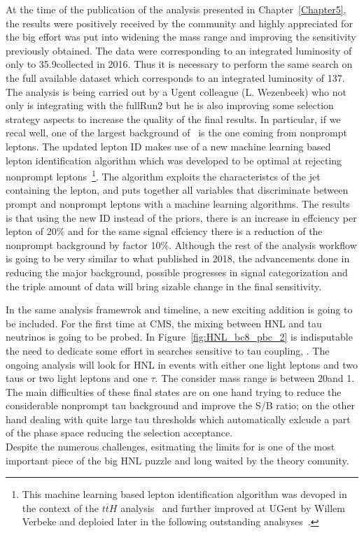 At the time of the publication of the analysis presented in
Chapter~\ref{Chapter5}, the results were positively received by the community and highly appreciated
for the big effort was put into widening the mass range and
improving the sensitivity previously obtained. The
data were corresponding to an integrated luminosity of only to
35.9\fbinv collected in 2016. Thus it is necessary to perform the same
search on the full available dataset which corresponds to an integrated luminosity of 
137\fbinv. \\
The analysis is being carried out by a Ugent colleague (L. Wezenbeek)
who not only is integrating with the fullRun2 but he is also improving
some selection strategy aspects to increase the quality of the final
results. In particular, if we recal well, one of the largest
background of~\cite{Sirunyan:2018mtv} is the one coming from nonprompt
leptons. The updated lepton ID makes use of a new machine learning
based lepton identification algorithm which was developed to be
optimal at rejecting nonprompt leptons~\footnote{This machine learning
based lepton identification algorithm was devoped in the context of
the $t\overline{t}H$ analysis~\cite{Sirunyan_2018_ttH} and further improved at UGent by Willem
Verbeke and deploied later in the following outstanding
analsyses~\cite{CMS:2018sgc_tzq, Sirunyan_2021_higgsmumu}.}. The algorithm exploits the
characteristcs of the jet containing the lepton, and puts together all
variables that discriminate between prompt and
nonprompt leptons with a machine learning algorithms. The results is
that using the new ID instead of the priors, there is an increase in effciency
per lepton of 20\% and for the same signal
effciency there is a reduction of the
nonprompt background
by factor 10\%. Although the rest of the analysis workflow is going to be very
similar to what published in 2018, the advancements done in reducing the
major background, possible progresses in signal categorization and the
triple amount of data will bring sizable change in the final
sensitivity.

In the same analysis framewrok and timeline, a new exciting addition
is going to be included. For the first time at CMS, the mixing between
HNL and tau neutrinos is going to be probed. In
Figure~\ref{fig:HNL_bc8_pbc_2} is indisputable the need to dedicate
some effort in searches sensitive to tau coupling, \mixpart. The
ongoing analysis will look for HNL in events with either one light leptons
and two taus or two light leptons and one $\tau$. The consider mass
range is between 20\GeV and 1\TeV. The main difficulties of these final
states are on one hand trying to reduce the considerable nonprompt tau background and
improve the S/B ratio; on the other hand dealing with quite large tau
\pt thresholds which automatically exlcude a part of the phase space
reducing the selection acceptance. \\
Despite the numerous challenges, esitmating the limits for \mixpart is
one of the most important piece of the big HNL puzzle and long waited
by the theory comunity.  

